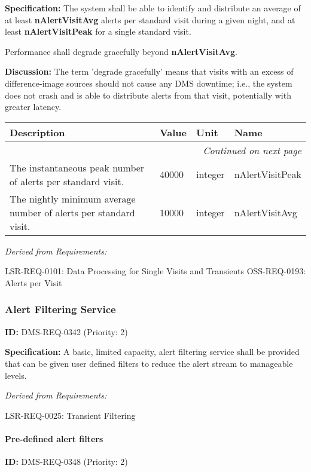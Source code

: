 \documentclass[SE,toc,lsstdraft]{lsstdoc}
\makeatletter
\newcommand{\paramname}[1]{\hspace{0pt}#1}
\newcommand{\unitname}[1]{\hspace{0pt}#1}
\newenvironment{parameters}[0]{%
\setlength\LTleft{0pt}
\setlength\LTright{\fill}
\begin{small}
\begin{longtable}[]{|p{0.49\textwidth}|l|p{0.6in}|p{1.70in}@{}|}

\hline \textbf{Description} & \textbf{Value} & \textbf{Unit} & \textbf{Name} \\ \hline
\endhead

\hline \multicolumn{4}{r}{\emph{Continued on next page}} \\
\endfoot

\hline\hline
\endlastfoot
}{%
\hline
\end{longtable}
\end{small}
}
\makeatother
\begin{document}
\textbf{Specification:}
The system shall be able to identify and distribute an average of at least \textbf{nAlertVisitAvg} alerts per standard visit during a given night, and at least \textbf{nAlertVisitPeak} for a single standard visit.

Performance shall degrade gracefully beyond \textbf{nAlertVisitAvg}.

\textbf{Discussion:}
The term 'degrade gracefully' means that visits with an excess of difference-image sources should not cause any DMS downtime; i.e., the system does not crash and is able to distribute alerts from that visit, potentially with greater latency.

\begin{parameters}
The instantaneous peak number of alerts per standard visit.
&
40000
&
\unitname{%
integer
}
&
\paramname{%
nAlertVisitPeak
} \\\hline
The nightly minimum average number of alerts per standard visit.
&
10000
&
\unitname{%
integer
}
&
\paramname{%
nAlertVisitAvg
} \\\hline
\end{parameters}

\emph{Derived from Requirements:}

LSR-REQ-0101:
Data Processing for Single Visits and Transients \newline
OSS-REQ-0193:
Alerts per Visit \newline

\subsubsection{Alert Filtering Service}

\label{DMS-REQ-0342}
\textbf{ID:} DMS-REQ-0342 (Priority: 2)

\textbf{Specification:} A basic, limited capacity, alert filtering service shall be provided that can be given user defined filters to reduce the alert stream to manageable levels.

\emph{Derived from Requirements:}

LSR-REQ-0025:
Transient Filtering \newline

\paragraph{Pre-defined alert filters}\hfill  %

\label{DMS-REQ-0348}
\textbf{ID:} DMS-REQ-0348 (Priority: 2)
\end{document}
